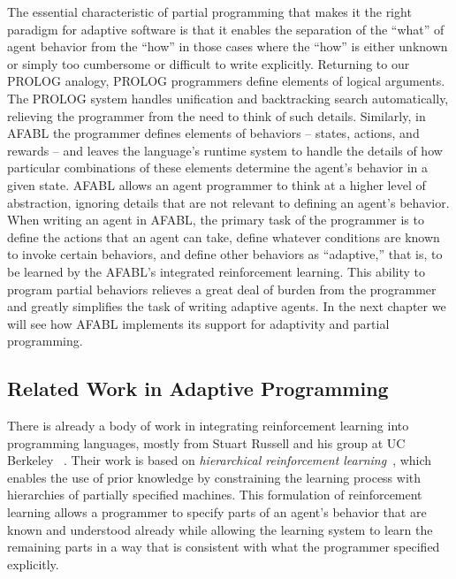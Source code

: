 The essential characteristic of partial programming that makes it the right paradigm for adaptive software is that it enables the separation of the ``what'' of agent behavior from the ``how'' in those cases where the ``how'' is either unknown or simply too cumbersome or difficult to write explicitly.  Returning to our PROLOG analogy, PROLOG programmers define elements of logical arguments.  The PROLOG system handles unification and backtracking search automatically, relieving the programmer from the need to think of such details. Similarly, in AFABL the programmer defines elements of behaviors -- states, actions, and rewards -- and leaves the language's runtime system to handle the details of how particular combinations of these elements determine the agent's behavior in a given state.  AFABL allows an agent programmer to think at a higher level of abstraction, ignoring details that are not relevant to defining an agent's behavior.  When writing an agent in AFABL, the primary task of the programmer is to define the actions that an agent can take, define whatever conditions are known to invoke certain behaviors, and define other behaviors as ``adaptive,'' that is, to be learned by the AFABL's integrated reinforcement learning.  This ability to program partial behaviors relieves a great deal of burden from the programmer and greatly simplifies the task of writing adaptive agents.  In the next chapter we will see how AFABL implements its support for adaptivity and partial programming.

\subsection{Related Work in Adaptive Programming}


There is already a body of work in integrating reinforcement learning into programming languages, mostly from Stuart Russell and his group at UC Berkeley ~\cite{andre2001programmable,andre2002state}.  Their work is based on {\it hierarchical reinforcement learning}~\cite{parr1998reinforcement,dietterich1998maxq}, which enables the use of prior knowledge by constraining the learning process with hierarchies of partially specified machines.  This formulation of reinforcement learning allows a programmer to specify parts of an agent's behavior that are known and understood already while allowing the learning system to learn the remaining parts in a way that is consistent with what the programmer specified explicitly.

